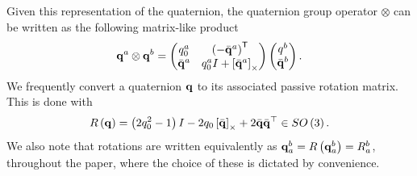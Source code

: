 Given this representation of the quaternion, the quaternion group operator
$\otimes$ can be written as the following matrix-like product
\begin{equation}
	\boldsymbol{\mathrm{q}}^a \otimes \boldsymbol{\mathrm{q}}^b = \begin{pmatrix} q_0^a & \left(-\bar{\boldsymbol{\mathrm{q}}}^{a}\right)^{\mathsf{T}} \\ \bar{\boldsymbol{\mathrm{q}}}^a & q^a_0 I + \left[ \bar{\boldsymbol{\mathrm{q}}}^a \right]_{\times} \end{pmatrix}
	\begin{pmatrix} q^b \\ \bar{\boldsymbol{\mathrm{q}}}^b\end{pmatrix}.
  \label{eq:quat_otimes_product}
\end{equation}
We frequently convert a quaternion $\boldsymbol{\mathrm{q}}$ to its associated passive rotation
matrix. This is done with
\begin{equation}
R\left(\boldsymbol{\mathrm{q}}\right)=\left(2q_{0}^{2}-1\right)I-2q_{0}\left[ \bar{\boldsymbol{\mathrm{q}}} \right]_{\times}+2\bar{\boldsymbol{\mathrm{q}}}\bar{\boldsymbol{\mathrm{q}}}^{\top}\in SO\left(3\right).
\label{eq:est_paper_R_from_q}
\end{equation}
We also note that rotations are written equivalently as
$\boldsymbol{\mathrm{q}}_a^b=R\left(\boldsymbol{\mathrm{q}}_a^b\right)=R_a^b$, throughout the paper, where the choice of these is dictated by convenience.

